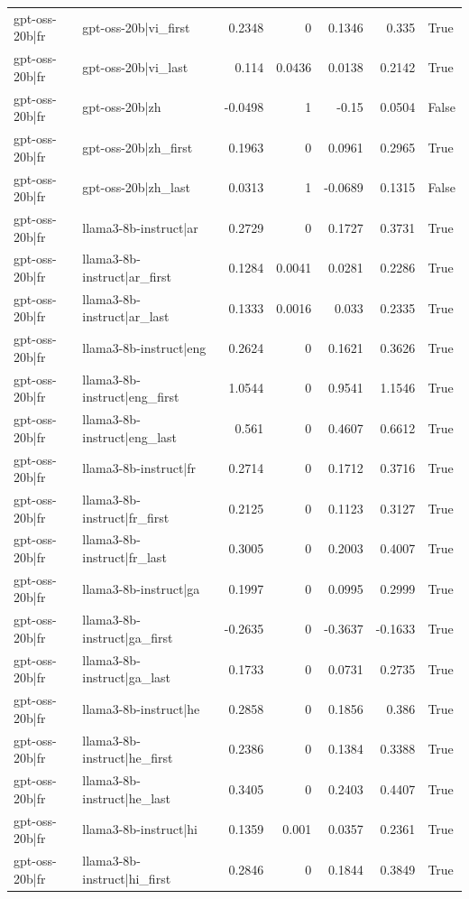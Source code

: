 \begin{table}
\begin{tabular}{l l r r r r l}
gpt-oss-20b|fr & gpt-oss-20b|vi_first & 0.2348 & 0 & 0.1346 & 0.335 & True \\
gpt-oss-20b|fr & gpt-oss-20b|vi_last & 0.114 & 0.0436 & 0.0138 & 0.2142 & True \\
gpt-oss-20b|fr & gpt-oss-20b|zh & -0.0498 & 1 & -0.15 & 0.0504 & False \\
gpt-oss-20b|fr & gpt-oss-20b|zh_first & 0.1963 & 0 & 0.0961 & 0.2965 & True \\
gpt-oss-20b|fr & gpt-oss-20b|zh_last & 0.0313 & 1 & -0.0689 & 0.1315 & False \\
gpt-oss-20b|fr & llama3-8b-instruct|ar & 0.2729 & 0 & 0.1727 & 0.3731 & True \\
gpt-oss-20b|fr & llama3-8b-instruct|ar_first & 0.1284 & 0.0041 & 0.0281 & 0.2286 & True \\
gpt-oss-20b|fr & llama3-8b-instruct|ar_last & 0.1333 & 0.0016 & 0.033 & 0.2335 & True \\
gpt-oss-20b|fr & llama3-8b-instruct|eng & 0.2624 & 0 & 0.1621 & 0.3626 & True \\
gpt-oss-20b|fr & llama3-8b-instruct|eng_first & 1.0544 & 0 & 0.9541 & 1.1546 & True \\
gpt-oss-20b|fr & llama3-8b-instruct|eng_last & 0.561 & 0 & 0.4607 & 0.6612 & True \\
gpt-oss-20b|fr & llama3-8b-instruct|fr & 0.2714 & 0 & 0.1712 & 0.3716 & True \\
gpt-oss-20b|fr & llama3-8b-instruct|fr_first & 0.2125 & 0 & 0.1123 & 0.3127 & True \\
gpt-oss-20b|fr & llama3-8b-instruct|fr_last & 0.3005 & 0 & 0.2003 & 0.4007 & True \\
gpt-oss-20b|fr & llama3-8b-instruct|ga & 0.1997 & 0 & 0.0995 & 0.2999 & True \\
gpt-oss-20b|fr & llama3-8b-instruct|ga_first & -0.2635 & 0 & -0.3637 & -0.1633 & True \\
gpt-oss-20b|fr & llama3-8b-instruct|ga_last & 0.1733 & 0 & 0.0731 & 0.2735 & True \\
gpt-oss-20b|fr & llama3-8b-instruct|he & 0.2858 & 0 & 0.1856 & 0.386 & True \\
gpt-oss-20b|fr & llama3-8b-instruct|he_first & 0.2386 & 0 & 0.1384 & 0.3388 & True \\
gpt-oss-20b|fr & llama3-8b-instruct|he_last & 0.3405 & 0 & 0.2403 & 0.4407 & True \\
gpt-oss-20b|fr & llama3-8b-instruct|hi & 0.1359 & 0.001 & 0.0357 & 0.2361 & True \\
gpt-oss-20b|fr & llama3-8b-instruct|hi_first & 0.2846 & 0 & 0.1844 & 0.3849 & True \\

\end{tabular}
\end{table}
